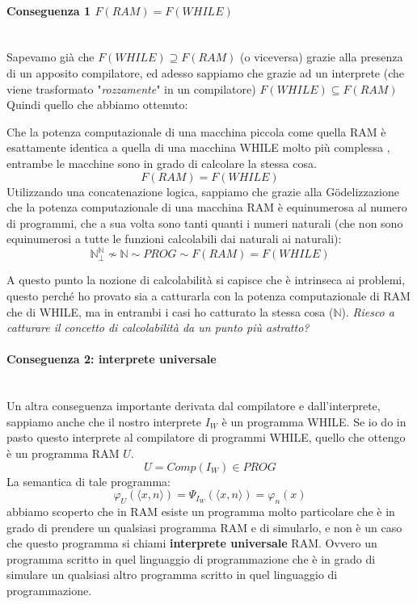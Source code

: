 \documentclass{article}
\begin{document}
\paragraph{Conseguenza 1 $F(RAM)=F(WHILE)$}\mbox{}\\
Sapevamo già che $F(WHILE)\supseteq F(RAM)$ (o viceversa) grazie alla presenza
di un apposito compilatore, ed adesso sappiamo che grazie ad un interprete
(che viene trasformato "\textit{rozzamente}" in un compilatore) $F(WHILE)\subseteq F(RAM)$
Quindi quello che abbiamo ottenuto:

Che la potenza computazionale di una macchina piccola come quella RAM è esattamente
identica a quella di una macchina WHILE molto più complessa , entrambe le macchine sono in
grado di calcolare la stessa cosa.
$$F(RAM)=F(WHILE)$$
Utilizzando una concatenazione logica, sappiamo che
grazie alla Gödelizzazione che la potenza computazionale di una macchina RAM è equinumerosa
al numero di programmi, che a sua volta sono tanti quanti i numeri naturali (che non sono
equinumerosi a tutte le funzioni calcolabili dai naturali ai naturali):
$$\mathbb{N}^{\mathbb{N}}_\bot\nsim\mathbb{N}\sim PROG \sim F(RAM)=F(WHILE)$$

A questo punto la nozione di calcolabilità si capisce che è intrinseca ai problemi,
questo perché ho provato sia a catturarla con la potenza computazionale di RAM che di WHILE,
ma in entrambi i casi ho catturato la stessa cosa ($\mathbb{N}$). \textit{Riesco
    a catturare il concetto di calcolabilità da un punto più astratto?}

\paragraph{Conseguenza 2: interprete universale}\mbox{}\\
Un altra conseguenza importante derivata dal compilatore e dall'interprete, sappiamo
anche che il nostro interprete $I_W$ è un programma WHILE. Se io do in pasto questo
interprete al compilatore di programmi WHILE, quello che ottengo è un programma
RAM $U$.
$$U=Comp(I_W)\in PROG$$
La semantica di tale programma:
$$\varphi_U\left(\langle x,n\rangle\right)=\Psi_{I_W}\left(\langle x,n\rangle\right)=\varphi_n\left( x\right)$$
abbiamo scoperto che in RAM esiste un programma molto particolare che è in
grado di prendere un qualsiasi programma RAM e di simularlo, e non è un caso che
questo programma si chiami \textbf{interprete universale} RAM. Ovvero un programma
scritto in quel linguaggio di programmazione che è in grado di simulare un qualsiasi
altro programma scritto in quel linguaggio di programmazione.
\end{document}
